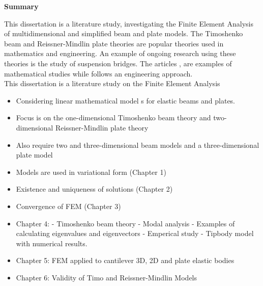 \documentclass[main.tex]{subfiles}
\begin{document}
\begin{center}
	\large \textbf{Summary}
\end{center}
This dissertation is a literature study, investigating the Finite Element Analysis of multidimensional and simplified beam and plate models. The Timoshenko beam and Reissner-Mindlin plate theories are popular theories used in mathematics and engineering. An example of ongoing research using these theories is the study of suspension bridges. The articles \cite{McK99}, \cite{BOC20} are examples of mathematical studies while \cite{SV86} follows an engineering approach.\\


 This dissertation is a literature study on the Finite Element Analysis 
 \begin{itemize}
	\item Considering linear mathematical model s for elastic beams and plates.
	\item Focus is on the one-dimensional Timoshenko beam theory and two-dimensional Reissner-Mindlin plate theory
	\item Also require two and three-dimensional beam models and a three-dimensional plate model
	\item Models are used in variational form (Chapter 1)
	\item Existence and uniqueness of solutions (Chapter 2)
	\item Convergence of FEM (Chapter 3)
	\item Chapter 4: - Timoshenko beam theory - Modal analysis - Examples of calculating eigenvalues and eigenvectors - Emperical study - Tipbody model with numerical results.
	\item Chapter 5: FEM applied to cantilever 3D, 2D and plate elastic bodies
	\item Chapter 6: Validity of Timo and Reissner-Mindlin Models
\end{itemize}
\end{document}
